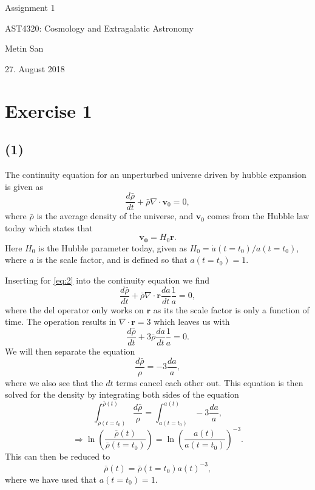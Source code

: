 \documentclass[a4paper]{article}
\begin{document}
\vspace*{2cm}
\begin{center} 
 
\huge{Assignment 1}

\vspace{15mm}

\large{AST4320: Cosmology and Extragalatic Astronomy}

\vspace{5mm}

\normalsize{Metin San}

\vspace{5mm}

\normalsize{27. August 2018}

\vspace{25mm}

\end{center}

\newpage
\section*{Exercise 1}
\subsection*{(1)}

The continuity equation for an unperturbed universe driven by hubble expansion is given as 
\begin{equation}\label{eq:1}
\frac{d\bar{\rho}}{dt} + \bar{\rho} \nabla \cdot \mathbf{v}_0 = 0,
\end{equation}
where $\bar{\rho}$ is the average density of the universe, and $\mathbf{v}_0$ comes from the Hubble law today which states that 
\begin{equation}\label{eq:2}
\mathbf{v_0} = H_0 \mathbf{r}.
\end{equation}
Here $H_0$ is the Hubble parameter today, given as $H_0 = \dot{a}(t=t_0) / a(t = t_0)$, where $a$ is the scale factor, and is defined so that $a(t= t_0) = 1$. 

Inserting for \eqref{eq:2} into the continuity equation we find
\[
\frac{d\bar{\rho}}{dt} + \bar{\rho} \nabla \cdot \mathbf{r}  \frac{da}{dt} \frac{1}{a}= 0,
\]
where the del operator only works on $\mathbf{r}$ as its the scale factor is only a function of time. The operation results in $\nabla \cdot \mathbf{r} = 3$ which leaves us with
\[
\frac{d\bar{\rho}}{dt} + 3\bar{\rho}\frac{da}{dt} \frac{1}{a} = 0.
\]
We will then separate the equation
\[
\frac{d\bar{\rho}}{\rho} = -3 \frac{da}{a},
\]
where we also see that the $dt$ terms cancel each other out. This equation is then solved for the density by integrating both sides of the equation
\[
\int_{\bar{\rho}(t=t_0)}^{\bar{\rho}(t)} \frac{d\bar{\rho}}{\rho} = \int_{a(t=t_0)}^{a(t)} -3 \frac{da}{a},
\]
\[
\Rightarrow \ln \left( \frac{\bar{\rho}(t)}{\bar{\rho}(t=t_0)}\right) = \ln \left( \frac{a(t)}{a(t=t_0)}\right)^{-3}.
\]
This can then be reduced to
\begin{equation}\label{eq:3}
\bar{\rho}(t) = \bar{\rho}(t=t_0)a(t)^{-3},
\end{equation}
where we have used that $a(t=t_0) = 1$.
\end{document}
